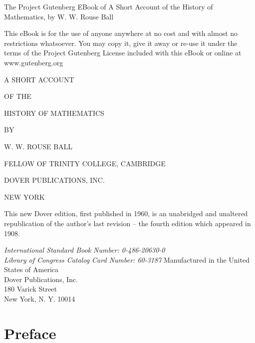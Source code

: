 \documentclass[12pt,oneside]{book}
\begin{document}
    
\frontmatter

The Project Gutenberg EBook of A Short Account of the History of Mathematics, by W. W. Rouse Ball \par 

This eBook is for the use of anyone anywhere at no cost and with almost no restrictions whatsoever. You may copy it, give it away or re-use it under
the terms of the Project Gutenberg License included with this eBook or online at www.gutenberg.org \par
\vspace{12pt}

\begin{titlepage}
    \centering
    \vspace*{2cm}
    {\LARGE A SHORT ACCOUNT \par}
    \vspace{1cm}
    {\Large OF THE \par}
    \vspace{1cm}
    {\Huge HISTORY OF MATHEMATICS \par}
    \vspace{2cm}
    {\Large BY \par}
    \vspace{1cm}
    {\Large W. W. ROUSE BALL \par}
    {\normalsize FELLOW OF TRINITY COLLEGE, CAMBRIDGE \par}
    \vfill
    {\Large DOVER PUBLICATIONS, INC. \par}
    {\Large NEW YORK \par}
\end{titlepage}

\begin{center}
    This new Dover edition, first published in 1960, is an unabridged and unaltered republication of the author's last revision -- the fourth edition
    which appeared in 1908. \par 
    \vspace{7cm}
    \textit{International Standard Book Number: 0-486-20630-0\\
    Library of Congress Catalog Card Number: 60-3187}
    \vfill
    Manufactured in the United States of America \\
    Dover Publications, Inc. \\
    180 Varick Street \\
    New York, N. Y. 10014 
\end{center}

\chapter{Preface}
\end{document}
